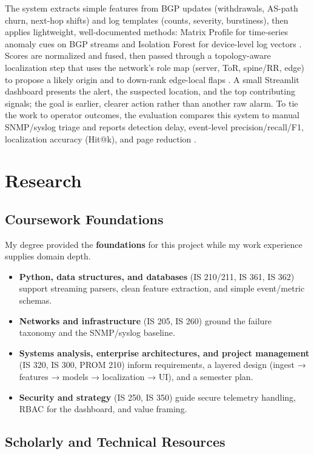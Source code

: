 \documentclass[11pt,letterpaper]{article}
\begin{document}
The system extracts simple features from BGP updates (withdrawals, AS-path churn, next-hop shifts) and log templates (counts, severity, burstiness), then applies lightweight, well-documented methods: Matrix Profile for time-series anomaly cues on BGP streams and Isolation Forest for device-level log vectors \cite{scott2024, cheng2021}. Scores are normalized and fused, then passed through a topology-aware localization step that uses the network's role map (server, ToR, spine/RR, edge) to propose a likely origin and to down-rank edge-local flaps \cite{tan2024}. A small Streamlit dashboard presents the alert, the suspected location, and the top contributing signals; the goal is earlier, clearer action rather than another raw alarm. To tie the work to operator outcomes, the evaluation compares this system to manual SNMP/syslog triage and reports detection delay, event-level precision/recall/F1, localization accuracy (Hit@k), and page reduction \cite{mohammed2021}.

\section{Research}

\subsection{Coursework Foundations}

My degree provided the \textbf{foundations} for this project while my work experience supplies domain depth.

\begin{itemize}
    \item \textbf{Python, data structures, and databases} (IS 210/211, IS 361, IS 362) support streaming parsers, clean feature extraction, and simple event/metric schemas.
    \item \textbf{Networks and infrastructure} (IS 205, IS 260) ground the failure taxonomy and the SNMP/syslog baseline.
    \item \textbf{Systems analysis, enterprise architectures, and project management} (IS 320, IS 300, PROM 210) inform requirements, a layered design (ingest → features → models → localization → UI), and a semester plan.
    \item \textbf{Security and strategy} (IS 250, IS 350) guide secure telemetry handling, RBAC for the dashboard, and value framing.
\end{itemize}

\subsection{Scholarly and Technical Resources}
\end{document}
